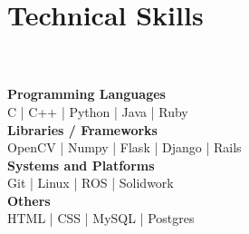 \documentclass[]{deedy-resume-openfont}
\begin{document}
\begin{minipage}[t]{0.33\textwidth}
\section{Technical Skills}\\~\\
\textbf{Programming Languages} \\
 C | C++ | Python | Java | Ruby \\
 \textbf{Libraries / Frameworks} \\ 
 OpenCV | Numpy | Flask | Django | Rails\\
\textbf{Systems and Platforms} \\ 
Git | Linux | ROS | Solidwork\\
\textbf{Others} \\ 
HTML | CSS | MySQL | Postgres\\





\sectionsep



\end{minipage}
\end{document}
